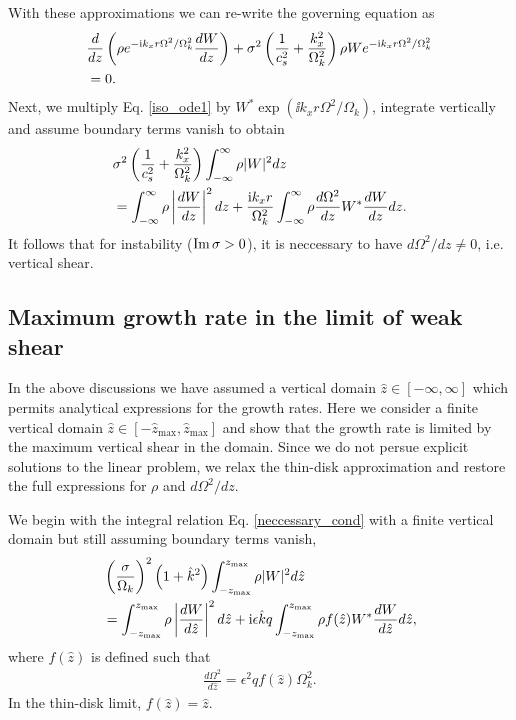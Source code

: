 With these approximations we can re-write the governing equation as
\begin{align}\label{iso_ode1}
  &\frac{d}{dz}\left(\rho e^{-\mathrm{i} k_x r
      \Omega^2/\Omega_k^2}\frac{dW}{dz}\right) +
  \sigma^2\left(\frac{1}{c_s^2}+\frac{k_x^2}{\Omega_k^2}\right) \rho W e^{-\mathrm{i} k_x r
    \Omega^2/\Omega_k^2} \notag\\
  &=0.
\end{align}
Next, we multiply Eq. \ref{iso_ode1} by $W^{*}\exp{\left(\ii k_x r
    \Omega^2/\Omega_k\right)}$, integrate 
vertically and assume boundary terms vanish to obtain
\begin{align}\label{neccessary_cond}
   &\sigma^2\left(\frac{1}{c_s^2}+\frac{k_x^2}{\Omega_k^2}\right)\int_{-\infty}^{\infty}\rho|W|^2dz \notag\\
  &=\int_{-\infty}^{\infty}\rho\left|\frac{dW}{dz}\right|^2dz 
  +\frac{\mathrm{i} k_x r}{\Omega_k^2}\int_{-\infty}^{\infty}\rho\frac{d\Omega^2}{dz}W^*\frac{dW}{dz}dz. 
\end{align}
It follows that for instability ($\operatorname{Im}\sigma>0$), it is neccessary to
have $d\Omega^2/dz\neq 0$, i.e. vertical shear.  


\subsection{Maximum growth rate in the limit of weak shear}   
In the above discussions we have assumed a vertical domain   
$\hat{z}\in[-\infty,\infty]$ which permits analytical expressions for
the growth rates. Here we consider a finite vertical domain
$\hat{z}\in[-\hat{z}_\mathrm{max},\hat{z}_\mathrm{max}]$ and show that
the growth rate is limited by the maximum vertical shear in
the domain. Since we do not persue explicit solutions to the linear
problem, we relax the thin-disk approximation and restore the full
expressions for $\rho$ and $d\Omega^2/dz$. 

We begin with the integral relation Eq. \ref{neccessary_cond} with a
finite vertical domain but still assuming boundary terms vanish,
\begin{align}
  &\left(\frac{\sigma}{\Omega_k}\right)^2\left(1+\hat{k}^2\right)
  \int_{-z_\mathrm{max}}^{z_\mathrm{max}}\rho|W|^2d\hat{z}  
  \notag\\ 
  &=\int_{-z_\mathrm{max}}^{z_\mathrm{max}}\rho\left|\frac{dW}{d\hat{z}}\right|^2d\hat{z}      
  +\mathrm{i}
  \epsilon\hat{k}q\int_{-z_\mathrm{max}}^{z_\mathrm{max}}\rho
  f(\hat{z}) W^*\frac{dW}{d\hat{z}}d\hat{z},    
\end{align}   
where $f(\hat{z})$ is defined such that
\begin{align}
  \frac{d\Omega^2}{d\hat{z}} = \epsilon^2q f(\hat{z})\Omega_k^2.
\end{align}
In the thin-disk limit, $f(\hat{z})=\hat{z}$.  

